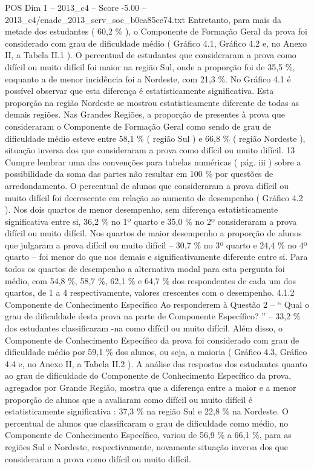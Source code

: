 \begin{textsample}{POS Dim 1 – 2013\_c4 – Score -5.00 – 2013\_c4/enade\_2013\_serv\_soc\_b0ca85ce74.txt}
Entretanto, para mais da metade dos estudantes ( 60,2 \% ), o Componente de Formação Geral da prova foi considerado com grau de dificuldade médio ( Gráfico 4.1, Gráfico 4.2 e, no Anexo II, a Tabela II.1 ).
O percentual de estudantes que consideraram a prova como difícil ou muito difícil foi maior na região Sul, onde a proporção foi de 35,5 \%, enquanto a de menor incidência foi a Nordeste, com 21,3 \%.
No Gráfico 4.1 é possível observar que esta diferença é estatisticamente significativa.
Esta proporção na região Nordeste se mostrou estatisticamente diferente de todas as demais regiões.
Nas Grandes Regiões, a proporção de presentes à prova que consideraram o Componente de Formação Geral como sendo de grau de dificuldade médio esteve entre 58,1 \% ( região Sul ) e 66,8 \% ( região Nordeste ), situação inversa dos que consideraram a prova como difícil ou muito difícil. 13 Cumpre lembrar uma das convenções para tabelas numéricas ( pág. iii ) sobre a possibilidade da soma das partes não resultar em 100 \% por questões de arredondamento.
O percentual de alunos que consideraram a prova difícil ou muito difícil foi decrescente em relação ao aumento de desempenho ( Gráfico 4.2 ).
Nos dois quartos de menor desempenho, sem diferença estatisticamente significativa entre si, 36,2 \% no 1º quarto e 35,0 \% no 2º consideraram a prova difícil ou muito difícil.
Nos quartos de maior desempenho a proporção de alunos que julgaram a prova difícil ou muito difícil – 30,7 \% no 3º quarto e 24,4 \% no 4º quarto – foi menor do que nos demais e significativamente diferente entre si.
Para todos os quartos de desempenho a alternativa modal para esta pergunta foi médio, com 54,8 \%, 58,7 \%, 62,1 \% e 64,7 \% dos respondentes de cada um dos quartos, de 1 a 4 respectivamente, valores crescentes com o desempenho. 4.1.2 Componente de Conhecimento Específico Ao responderem à Questão 2 – “ Qual o grau de dificuldade desta prova na parte de Componente Específico? ” – 33,2 \% dos estudantes classificaram -na como difícil ou muito difícil.
Além disso, o Componente de Conhecimento Específico da prova foi considerado com grau de dificuldade médio por 59,1 \% dos alunos, ou seja, a maioria ( Gráfico 4.3, Gráfico 4.4 e, no Anexo II, a Tabela II.2 ).
A análise das respostas dos estudantes quanto ao grau de dificuldade do Componente de Conhecimento Específico da prova, agregados por Grande Região, mostra que a diferença entre a maior e a menor proporção de alunos que a avaliaram como difícil ou muito difícil é estatisticamente significativa : 37,3 \% na região Sul e 22,8 \% na Nordeste.
O percentual de alunos que classificaram o grau de dificuldade como médio, no Componente de Conhecimento Específico, variou de 56,9 \% a 66,1 \%, para as regiões Sul e Nordeste, respectivamente, novamente situação inversa dos que consideraram a prova como difícil ou muito difícil.

\end{textsample}
